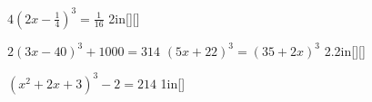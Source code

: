 

{
    $4(2x-\frac{1}{4})^3  = \frac{1}{16}$
}{2in}[\raggedleft{}][\raggedleft{}]




\myProblems
{
    $ 2 (3x-40)^3 + 1000 = 314 $
}
{
    $ (5x + 22)^3 = (35 + 2x)^3$
}{2.2in}[\raggedleft{}][\raggedleft{}]




\myWideProblem
{
    $(x^2 + 2x + 3 )^3 - 2 = 214$
}{1in}[\raggedleft{}]
